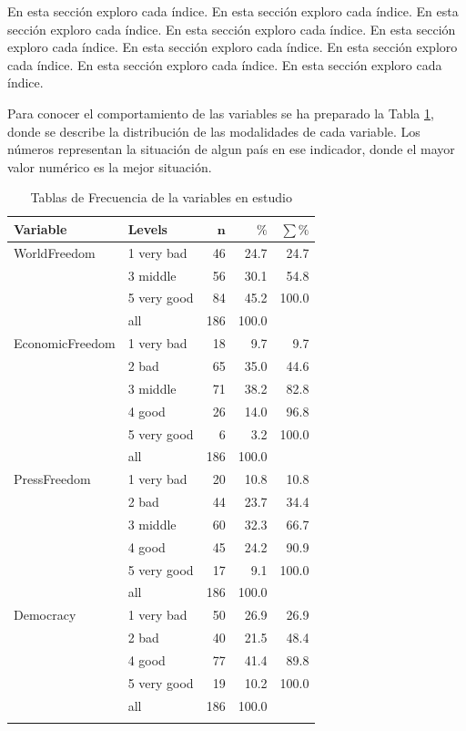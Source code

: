 \documentclass{article}
\begin{document}
En esta sección exploro cada índice. En esta sección exploro cada índice. En esta sección exploro cada índice. En esta sección exploro cada índice. En esta sección exploro cada índice. En esta sección exploro cada índice. En esta sección exploro cada índice. En esta sección exploro cada índice. En esta sección exploro cada índice.





Para conocer el comportamiento de las variables se ha preparado la Tabla \ref{Tfrecuencias}, donde se describe la distribución de las modalidades de cada variable. Los números representan la situación de algun país en ese indicador, donde el mayor valor numérico es la mejor situación.

\begingroup\normalsize
\begin{longtable}{llrrr}
\caption{Tablas de Frecuencia de la variables en estudio} \\ 
 \textbf{Variable} & \textbf{Levels} & $\mathbf{n}$ & $\mathbf{\%}$ & $\mathbf{\sum \%}$ \\ 
  \hline \hline
WorldFreedom & 1 very bad & 46 & 24.7 & 24.7 \\ 
   & 3 middle & 56 & 30.1 & 54.8 \\ 
   & 5 very good & 84 & 45.2 & 100.0 \\ 
   \hline
 & all & 186 & 100.0 &  \\ 
   \hline
\hline
EconomicFreedom & 1 very bad & 18 & 9.7 & 9.7 \\ 
   & 2 bad & 65 & 35.0 & 44.6 \\ 
   & 3 middle & 71 & 38.2 & 82.8 \\ 
   & 4 good & 26 & 14.0 & 96.8 \\ 
   & 5 very good & 6 & 3.2 & 100.0 \\ 
   \hline
 & all & 186 & 100.0 &  \\ 
   \hline
\hline
PressFreedom & 1 very bad & 20 & 10.8 & 10.8 \\ 
   & 2 bad & 44 & 23.7 & 34.4 \\ 
   & 3 middle & 60 & 32.3 & 66.7 \\ 
   & 4 good & 45 & 24.2 & 90.9 \\ 
   & 5 very good & 17 & 9.1 & 100.0 \\ 
   \hline
 & all & 186 & 100.0 &  \\ 
   \hline
\hline
Democracy & 1 very bad & 50 & 26.9 & 26.9 \\ 
   & 2 bad & 40 & 21.5 & 48.4 \\ 
   & 4 good & 77 & 41.4 & 89.8 \\ 
   & 5 very good & 19 & 10.2 & 100.0 \\ 
   \hline
 & all & 186 & 100.0 &  \\ 
   \hline
\hline
\hline
\label{Tfrecuencias}
\end{longtable}
\endgroup
\end{document}
